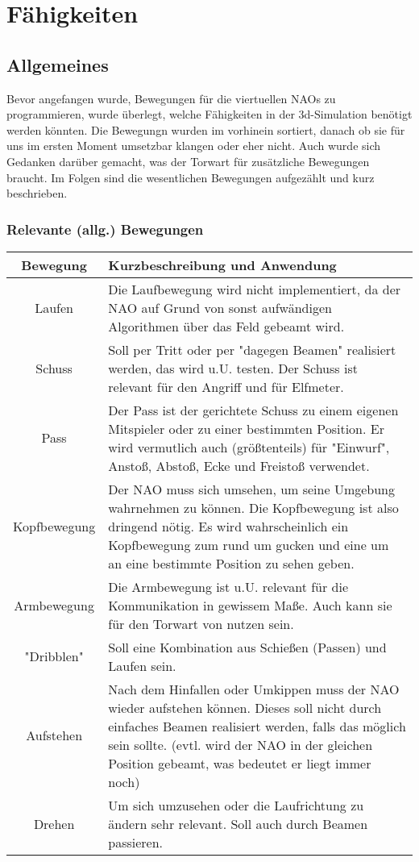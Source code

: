 \section*{Fähigkeiten}
\subsection*{Allgemeines}
Bevor angefangen wurde, Bewegungen für die viertuellen NAOs zu 
programmieren, wurde überlegt, welche Fähigkeiten in der 3d-Simulation 
benötigt werden könnten. Die Bewegungn wurden im vorhinein sortiert, 
danach ob sie für uns im ersten Moment umsetzbar klangen oder eher 
nicht. Auch wurde sich Gedanken darüber gemacht, was der Torwart für 
zusätzliche Bewegungen braucht. Im Folgen sind die wesentlichen 
Bewegungen aufgezählt und kurz beschrieben.

\subsubsection*{Relevante (allg.) Bewegungen}

\begin{tabular}{|c|p{12cm}|}
\hline 
Bewegung & Kurzbeschreibung und Anwendung \\ 
\hline 
Laufen & Die Laufbewegung wird nicht implementiert, da der NAO auf Grund von sonst aufwändigen Algorithmen über das Feld gebeamt wird. \\ 
\hline 
Schuss & Soll per Tritt oder per "dagegen Beamen" realisiert werden, das wird 
u.U. testen. Der Schuss ist relevant für den Angriff und für Elfmeter. \\ 
\hline 
Pass & Der Pass ist der gerichtete Schuss zu einem eigenen Mitspieler oder 
zu einer bestimmten Position. Er wird vermutlich auch (größtenteils) für
 "Einwurf", Anstoß, Abstoß, Ecke und Freistoß verwendet. \\ 
\hline 
Kopfbewegung & Der NAO muss sich umsehen, um seine Umgebung wahrnehmen zu können. 
Die Kopfbewegung ist also dringend nötig. Es wird wahrscheinlich ein 
Kopfbewegung zum rund um gucken und eine um an eine bestimmte Position 
zu sehen geben. \\ 
\hline 
Armbewegung & Die Armbewegung ist u.U. relevant für die Kommunikation in gewissem Maße. Auch kann sie für den Torwart von nutzen sein. \\ 
\hline 
"Dribblen" & Soll eine Kombination aus Schießen (Passen) und Laufen sein. \\ 
\hline 
Aufstehen & Nach dem Hinfallen oder Umkippen muss der NAO wieder aufstehen 
können. Dieses soll nicht durch einfaches Beamen realisiert werden, 
falls das möglich sein sollte. (evtl. wird der NAO in der gleichen 
Position gebeamt, was bedeutet er liegt immer noch) \\ 
\hline 
Drehen & Um sich umzusehen oder die Laufrichtung zu ändern sehr relevant. Soll auch durch Beamen passieren.\\ 
\hline 
\end{tabular} 

